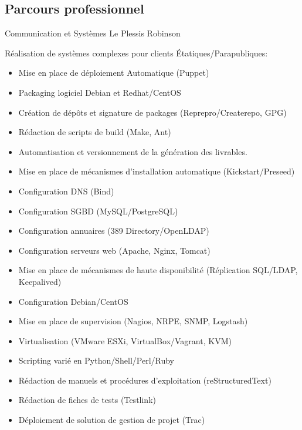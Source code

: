 \documentclass[10pt,a4paper]{moderncv}
\begin{document}
\subsection{Parcours professionnel}

              {Communication et Systèmes}
              {Le Plessis Robinson}
              {}
              {Réalisation de systèmes complexes pour clients Étatiques/Parapubliques:
                \begin{itemize}
                \item Mise en place de déploiement Automatique (Puppet)
                \item Packaging logiciel Debian et Redhat/CentOS
                \item Création de dépôts et signature de packages (Reprepro/Createrepo, GPG)
                \item Rédaction de scripts de build (Make, Ant)
                \item Automatisation et versionnement de la génération des livrables.
                \item Mise en place de mécanismes d'installation automatique (Kickstart/Preseed)
                \item Configuration DNS (Bind)
                \item Configuration SGBD (MySQL/PostgreSQL)
                \item Configuration annuaires (389 Directory/OpenLDAP)
                \item Configuration serveurs web (Apache, Nginx, Tomcat)
                \item Mise en place de mécanismes de haute disponibilité (Réplication SQL/LDAP, Keepalived)
                \item Configuration Debian/CentOS
                \item Mise en place de supervision (Nagios, NRPE, SNMP, Logstash)
                \item Virtualisation (VMware ESXi, VirtualBox/Vagrant, KVM)
                \item Scripting varié en Python/Shell/Perl/Ruby
                \item Rédaction de manuels et procédures d'exploitation (reStructuredText)
                \item Rédaction de fiches de tests (Testlink)
                \item Déploiement de solution de gestion de projet (Trac)
                \end{itemize}
              }
\end{document}

